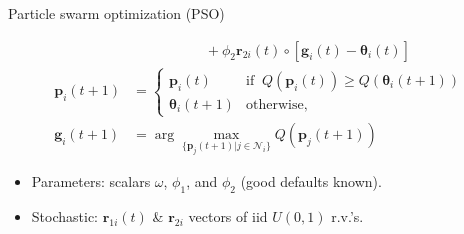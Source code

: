 \documentclass[svgnames, final]{beamer} %
\begin{document}
\begin{frame}{}
\begin{columns}[T]
\begin{column}{0.32\textwidth}
\begin{block}{\large Particle swarm optimization (PSO) \citep{clerc2002particle,blum2008swarm}}
\begin{itemize}
\begin{align*}
                               &\phantom{= \omega \bm{v}_i(t)} \ + \phi_2 \bm{r}_{2i}(t)\circ[\bm{g}_i(t) - \bm{\theta}_i(t)]\\
            \bm{p}_i(t+1) &= \begin{cases} \bm{p}_i(t)   & \mbox{if }\  Q(\bm{p}_i(t)) \ge Q(\bm{\theta}_i(t + 1))\\
              \bm{\theta}_i(t+1) & \mbox{otherwise},
            \end{cases}\\
            \bm{g}_i(t+1) &= \arg\max_{\{\bm{p}_j(t+1)|j\in\mathcal{N}_i\}}Q(\bm{p}_j(t+1))
          \end{align*}
        \end{itemize}
        \begin{itemize}\setlength{\itemsep0.5em}
        \item Parameters: scalars $\omega$, $\phi_1$, and $\phi_2$ (good defaults known).
        \item Stochastic: $\bm{r}_{1i}(t)$ \& $\bm{r}_{2i}$ vectors of iid $U(0,1)$ r.v.'s.
        \end{itemize}
      \end{block}


\end{column}
\end{columns}
\end{frame}
\end{document}

